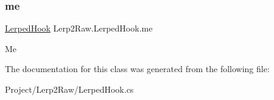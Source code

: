 \subsubsection{\texorpdfstring{me}{me}}
{\footnotesize\ttfamily \hyperlink{class_lerp2_raw_1_1_lerped_hook}{Lerped\+Hook} Lerp2\+Raw.\+Lerped\+Hook.\+me\hspace{0.3cm}{\ttfamily [static]}}



Me 



The documentation for this class was generated from the following file\+:\begin{DoxyCompactItemize}
\item 
Project/\+Lerp2\+Raw/Lerped\+Hook.\+cs\end{DoxyCompactItemize}
